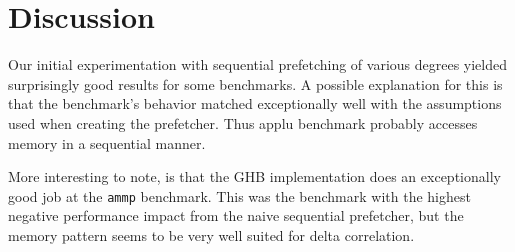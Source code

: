 \section{Discussion}
\label{sec:discussion}

Our initial experimentation with sequential prefetching of various degrees yielded surprisingly good results for some benchmarks.
A possible explanation for this is that the benchmark's behavior matched exceptionally well with the assumptions used when creating the prefetcher.
Thus  applu benchmark probably accesses memory in a sequential manner.

More interesting to note, is that the GHB implementation does an exceptionally good job at the \texttt{ammp} benchmark.
This was the benchmark with the highest negative performance impact from the naive sequential prefetcher, but the memory pattern seems to be very well suited for delta correlation.
